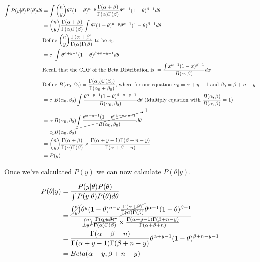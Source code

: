 \documentclass{article}
\begin{document}
\begin{align*}
\int P(y|\theta)P(\theta) d\theta &= \int \binom{n}{y}\theta^{y}(1-\theta)^{n-y} \frac{\Gamma(\alpha+\beta)}{\Gamma(\alpha)\Gamma(\beta)} \theta^{\alpha-1}(1-\theta)^{\beta-1} d\theta\\
&=\binom{n}{y}\frac{\Gamma(\alpha+\beta)}{\Gamma(\alpha)\Gamma(\beta)} \int \theta^{y}(1-\theta)^{n-y} \theta^{\alpha-1}(1-\theta)^{\beta-1} d\theta\\
&\text{Define } \binom{n}{y}\frac{\Gamma(\alpha+\beta)}{\Gamma(\alpha)\Gamma(\beta)} \text{ to be $c_1$}. \\
&= c_{1} \int \theta^{\alpha + y - 1}(1-\theta)^{\beta + n-y -1}  d\theta\\
&\text{Recall that the CDF of the Beta Distribution is } = \frac{\int x^{\alpha-1} (1-x)^{\beta - 1}}{B(\alpha,\beta)} dx\\
&\text{Define }B(\alpha_0,\beta_0) = \frac{\Gamma(\alpha_0)\Gamma(\beta_0)}{\Gamma(\alpha_0+\beta_0)} 
\text{, where for our equation $\alpha_0 = \alpha + y-1$ and $\beta_0 = \beta+n-y$}\\
&= c_{1}B(\alpha_0,\beta_0) \int \frac{\theta^{\alpha + y - 1}(1-\theta)^{\beta + n-y -1}}{B(\alpha_0,\beta_0)}  d\theta \text{ (Multiply equation with }\frac{B(\alpha,\beta)}{B(\alpha,\beta)} = 1)\\ 
&= c_{1}B(\alpha_0,\beta_0) \cancelto{1}{\int \frac{\theta^{\alpha + y - 1}(1-\theta)^{\beta + n-y -1}}{B(\alpha_0,\beta_0)}  d\theta}\\
&= c_{1}B(\alpha_0,\beta_0)\\
&= \binom{n}{y}\frac{\Gamma(\alpha+\beta)}{\Gamma(\alpha)\Gamma(\beta)} \times \frac{\Gamma(\alpha + y-1)\Gamma(\beta+n-y)}{\Gamma(\alpha+\beta+n)}\\
&= P(y)
\end{align*}

\newpage
Once we've calculated $P(y)$ we can now calculate $P(\theta|y)$.

\begin{align*}
P(\theta|y) 
&= \frac{P(y|\theta)P(\theta)}{\int P(y|\theta)P(\theta) d\theta}\\
&= \frac{\cancel{\binom{n}{y}}\theta^{y}(1-\theta)^{n-y} \cancel{\frac{\Gamma(\alpha+\beta)}{\Gamma(\alpha)\Gamma(\beta)}} \theta^{\alpha-1}(1-\theta)^{\beta-1} }  
{ \cancel{\binom{n}{y}\frac{\Gamma(\alpha+\beta)}{\Gamma(\alpha)\Gamma(\beta)}} \times \frac{\Gamma(\alpha + y-1)\Gamma(\beta+n-y)}{\Gamma(\alpha+\beta+n)}}\\
&=\frac{\Gamma(\alpha+\beta+n)}{\Gamma(\alpha + y-1)\Gamma(\beta+n-y)} \theta^{\alpha+y-1} (1-\theta)^{\beta+n-y-1}\\
&=Beta(\alpha+y,\beta+n-y)
\end{align*}
\end{document}
